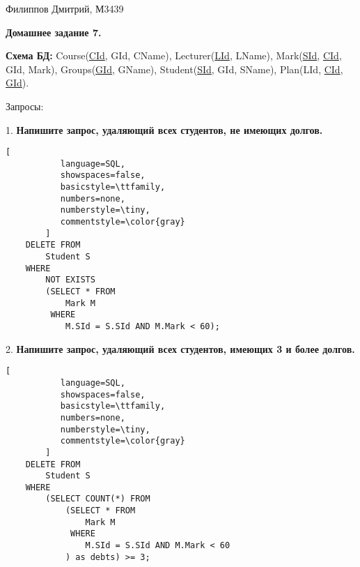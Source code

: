 \documentclass[11pt,a4paper,oneside]{article}
\begin{document}
\renewcommand{\t}[1]{\mbox{\texttt{#1}}}
\newcommand{\s}[1]{\mbox{``\t{#1}''}}
\newcommand{\eps}{\varepsilon}
\renewcommand{\phi}{\varphi}
\newcommand{\plainhat}{{\char 94}}

\newcommand{\Z}{\mathbb{Z}}
\newcommand{\w}[1]{``\t{#1}''}




Филиппов Дмитрий, М3439
\newline

\begin{LARGE} \textbf{Домашнее задание 7.} \end{LARGE}
\newline

\textbf{Схема БД:} Course(\underline{CId}, GId, CName), Lecturer(\underline{LId}, LName), Mark(\underline{SId}, \underline{CId}, GId, Mark), Groups(\underline{GId}, GName), Student(\underline{SId}, GId, SName), Plan(LId, \underline{CId}, \underline{GId}).
\newline

Запросы:

1. \textbf{Напишите запрос, удаляющий всех студентов, не имеющих долгов.}

\begin{lstlisting}[
           language=SQL,
           showspaces=false,
           basicstyle=\ttfamily,
           numbers=none,
           numberstyle=\tiny,
           commentstyle=\color{gray}
        ]
    DELETE FROM
        Student S 
    WHERE
        NOT EXISTS
        (SELECT * FROM
            Mark M 
         WHERE 
            M.SId = S.SId AND M.Mark < 60);
\end{lstlisting}

2. \textbf{Напишите запрос, удаляющий всех студентов, имеющих 3 и более долгов.}

\begin{lstlisting}[
           language=SQL,
           showspaces=false,
           basicstyle=\ttfamily,
           numbers=none,
           numberstyle=\tiny,
           commentstyle=\color{gray}
        ]
    DELETE FROM
        Student S
    WHERE
        (SELECT COUNT(*) FROM
            (SELECT * FROM
                Mark M
             WHERE 
                M.SId = S.SId AND M.Mark < 60
            ) as debts) >= 3;
\end{lstlisting}
\end{document}
